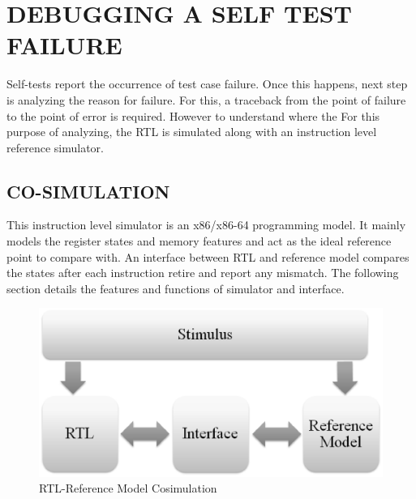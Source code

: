 \section{DEBUGGING A SELF TEST FAILURE}

Self-tests report the occurrence of test case failure. Once this happens, next step is analyzing the reason for failure.  For this, a traceback from the point of failure to the point of error is required. However to understand where the  
For this purpose of analyzing, the RTL is simulated along with an instruction level reference simulator. 


\subsection {CO-SIMULATION}
This instruction level simulator is an x86/x86-64 programming model. It mainly models the register states and memory features and act as the ideal reference point to compare with. An interface between RTL and reference model compares the states after each instruction retire and report any mismatch. The following section details the features and functions of simulator and interface. 



\begin{figure}[H]
\centering
\includegraphics[width=4.5in]{./figures/interface.eps}
\caption{RTL-Reference Model Cosimulation} 
\label{fig:interface.eps}
\end{figure}





